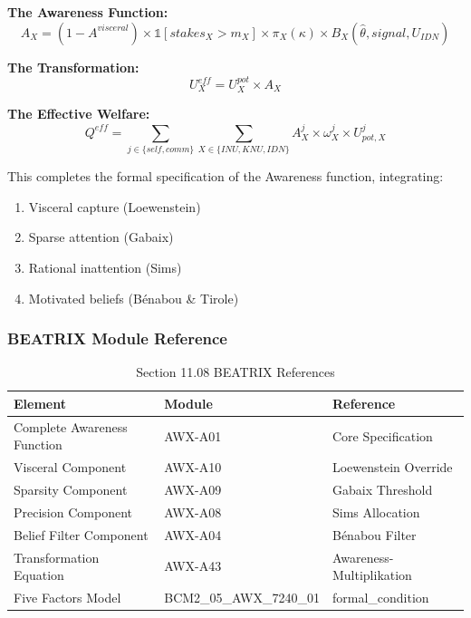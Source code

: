 \begin{tcolorbox}[colback=green!5!white, colframe=green!75!black, title=The Complete Awareness-Mediated Transformation]

\textbf{The Awareness Function:}
\begin{equation}
A_X = (1 - A^{visceral}) \times \mathbb{1}[stakes_X > m_X] \times \pi_X(\kappa) \times B_X(\hat{\theta}, signal, U_{IDN})
\end{equation}

\textbf{The Transformation:}
\begin{equation}
U^{eff}_X = U^{pot}_X \times A_X
\end{equation}

\textbf{The Effective Welfare:}
\begin{equation}
Q^{eff} = \sum_{j \in \{self, comm\}} \sum_{X \in \{INU, KNU, IDN\}} A^j_X \times \omega^j_X \times U^j_{pot,X}
\end{equation}

\end{tcolorbox}

This completes the formal specification of the Awareness function, integrating:
\begin{enumerate}
\item Visceral capture (Loewenstein)
\item Sparse attention (Gabaix)
\item Rational inattention (Sims)
\item Motivated beliefs (Bénabou \& Tirole)
\end{enumerate}

\subsubsection{BEATRIX Module Reference}
\label{subsubsec:beatrix-ref}

\begin{table}[htbp]
\centering
\caption{Section 11.08 BEATRIX References}
\label{tab:11-8-beatrix}
\renewcommand{\arraystretch}{1.3}
\begin{tabular}{@{}lll@{}}
\toprule
\textbf{Element} & \textbf{Module} & \textbf{Reference} \\
\midrule
Complete Awareness Function & AWX-A01 & Core Specification \\
Visceral Component & AWX-A10 & Loewenstein Override \\
Sparsity Component & AWX-A09 & Gabaix Threshold \\
Precision Component & AWX-A08 & Sims Allocation \\
Belief Filter Component & AWX-A04 & Bénabou Filter \\
Transformation Equation & AWX-A43 & Awareness-Multiplikation \\
Five Factors Model & BCM2\_05\_AWX\_7240\_01 & formal\_condition \\
\bottomrule
\end{tabular}
\end{table}

